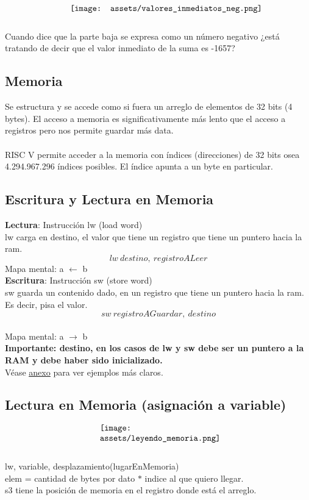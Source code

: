 \documentclass[10pt,a4paper]{article}
\begin{document}
\[\begin{minipage}[b]{0.6\textwidth}
    \texttt{[image: assets/valores\_inmediatos\_neg.png]}
    \label{fig:valores_neg}
\end{minipage}\]
Cuando dice que la parte baja se expresa como un número negativo ¿está tratando de decir que el valor inmediato de la suma es -1657?
\subsection*{Memoria}
Se estructura y se accede como si fuera un arreglo de elementos de 32 bits (4 bytes). El acceso a memoria es significativamente más lento que el acceso a registros pero nos permite guardar más data. \\ \\
RISC V permite acceder a la memoria con índices (direcciones) de 32 bits osea 4.294.967.296 índices posibles. El índice apunta a un byte en particular. \\ \subsection*{Escritura y Lectura en Memoria}
\textbf{Lectura}: Instrucción lw (load word) \\ 
lw carga en destino, el valor que tiene un registro que tiene un puntero hacia la ram. \\ 
\[lw \ destino, \ registroALeer\] 
Mapa mental: a \( \leftarrow \) b \\
\textbf{Escritura}: Instrucción sw (store word) \\
sw guarda un contenido dado, en un registro que tiene un puntero hacia la ram. Es decir, pisa el valor.
\[sw \ registroAGuardar, \ destino\] \\ 
Mapa mental: a \( \rightarrow \) b \\
\textbf{Importante: destino, en los casos de lw y sw debe ser un puntero a la RAM y debe haber sido inicializado.} \\
Véase \hyperref[subsec:punteros_ram_registros]{\underline{anexo}} para ver ejemplos más claros. 
\subsection*{Lectura en Memoria (asignación a variable)}
\[\begin{minipage}[b]{0.4\textwidth}
    \texttt{[image: assets/leyendo\_memoria.png]}
    \label{fig:leyendo_memoria}
\end{minipage}\] 
lw, variable, desplazamiento(lugarEnMemoria) \\
elem = cantidad de bytes por dato \(\ast\) indice al que quiero llegar. \\
s3 tiene la posición de memoria en el registro donde está el arreglo. \\
\end{document}
